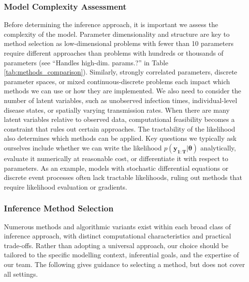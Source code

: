 \documentclass{article}
\begin{document}
\subsubsection{Model Complexity Assessment}

Before determining the inference approach, it is important we assess the complexity of the model.
Parameter dimensionality and structure are key to method selection as low-dimensional problems with fewer than 10 parameters require different approaches than problems with hundreds or thousands of parameters (see ``Handles high-dim. params.?'' in Table \ref{tab:methods_comparison}).
Similarly, strongly correlated parameters, discrete parameter spaces, or mixed continuous-discrete problems each impact which methods we can use or how they are implemented.
We also need to consider the number of latent variables, such as unobserved infection times, individual-level disease states, or spatially varying transmission rates.
When there are many latent variables relative to observed data, computational feasibility becomes a constraint that rules out certain approaches.
The tractability of the likelihood also determines which methods can be applied.
Key questions we typically ask ourselves include whether we can write the likelihood $p(\boldsymbol{y_{1:T}}|\boldsymbol{\theta})$ analytically, evaluate it numerically at reasonable cost, or differentiate it with respect to parameters.
As an example, models with stochastic differential equations or discrete event processes often lack tractable likelihoods, ruling out methods that require likelihood evaluation or gradients.

\subsubsection{Inference Method Selection}

Numerous methods and algorithmic variants exist within each broad class of inference approach, with distinct computational characteristics and practical trade-offs.
Rather than adopting a universal approach, our choice should be tailored to the specific modelling context, inferential goals, and the expertise of our team.
The following gives guidance to selecting a method, but does not cover all settings.
\end{document}
